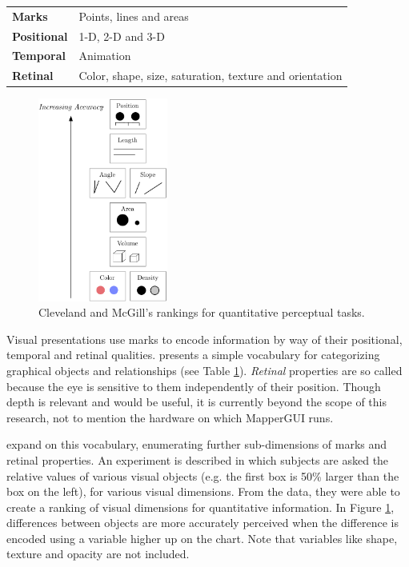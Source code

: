 \begin{table}
	\centering
	\label{tab:graphical_relationships}
		\begin{tabular}{l  l}
		\hline\hline
		\textbf{Marks}& Points, lines and areas\\
		\textbf{Positional}& 1-D, 2-D and 3-D\\
		\textbf{Temporal}& Animation\\
		\textbf{Retinal}& Color, shape, size, saturation, texture and orientation\\
		\hline
		\end{tabular}
\end{table}

\begin{figure}
	\centering
		\includegraphics[width=0.38\textwidth]{figures/accuracy_of_visual_dimensions}
		\caption{Cleveland and McGill's rankings for quantitative perceptual tasks.}
		\label{fig:accuracy_of_visual_dimensions}
\end{figure}

Visual presentations use marks to encode information by way of their positional, temporal and retinal qualities.  presents a simple vocabulary for categorizing graphical objects and relationships (see Table \ref{tab:graphical_relationships}). \emph{Retinal} properties are so called because the eye is sensitive to them independently of their position. Though depth is relevant and would be useful, it is currently beyond the scope of this research, not to mention the hardware on which MapperGUI runs. 


 expand on this vocabulary, enumerating further sub-dimensions of marks and retinal properties. An experiment is described in which subjects are asked the relative values of various visual objects (e.g. the first box is 50\% larger than the box on the left), for various visual dimensions. From the data, they were able to create a ranking of visual dimensions for quantitative information. In Figure \ref{fig:accuracy_of_visual_dimensions}, differences between objects are more accurately perceived when the difference is encoded using a variable higher up on the chart. Note that variables like shape, texture and opacity are not included. 


